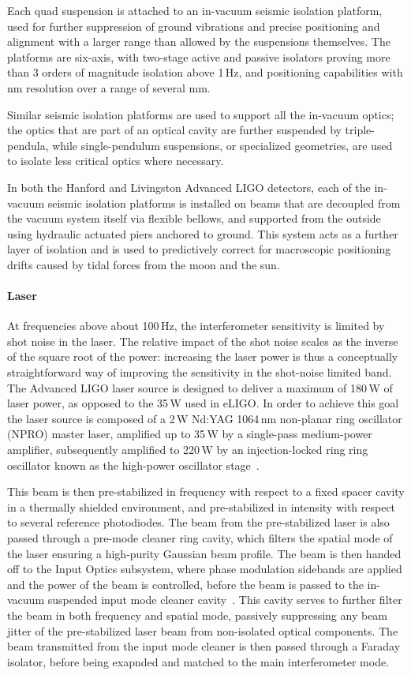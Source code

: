 Each quad suspension is attached to an in-vacuum seismic isolation platform, 
used for further suppression of ground vibrations and precise positioning and 
alignment with a larger range than allowed by the suspensions themselves. The 
platforms are six-axis, with two-stage active and passive isolators proving more 
than 3 orders of magnitude isolation above 1\,Hz, and positioning capabilities 
with nm resolution over a range of several mm.

Similar seismic isolation platforms are used to support all the in-vacuum optics; 
the optics that are part of an optical cavity are further suspended by triple-pendula, while 
single-pendulum suspensions, or specialized geometries, are used to isolate 
less critical optics where necessary.

In both the Hanford and Livingston Advanced LIGO detectors, 
each of the in-vacuum seismic isolation platforms is 
installed on beams that are decoupled from the vacuum system itself via 
flexible bellows, and supported from the outside using hydraulic actuated 
piers anchored to ground.
This system acts as a further layer of isolation and is used to predictively correct for macroscopic positioning drifts caused by tidal forces from the moon and the sun.

\paragraph*{Laser}
At frequencies above about 100\,Hz, the interferometer sensitivity is limited by shot 
noise in the laser. The relative impact of the shot noise scales as the inverse of the 
square root of the power: increasing the laser power is thus a conceptually 
straightforward way of improving the sensitivity in the shot-noise limited band. 
The Advanced LIGO laser source is designed to deliver a maximum of 180\,W of laser power, as opposed to the 35\,W used in eLIGO.
In order to achieve this goal the laser source is composed of a 2\,W Nd:YAG 1064\,nm non-planar ring oscillator (NPRO) master laser, amplified up to 35\,W by a single-pass medium-power amplifier, subsequently amplified to 220\,W by an injection-locked ring ring oscillator known as the high-power oscillator stage~\cite{Kwee_2012}. 

This beam is then pre-stabilized in frequency with respect to a fixed spacer cavity in a thermally shielded environment, and pre-stabilized in intensity with respect to several reference photodiodes. 
The beam from the pre-stabilized laser is also passed through a pre-mode cleaner ring cavity, which filters the spatial mode of the laser ensuring a high-purity Gaussian beam profile. 
The beam is then handed off to the Input Optics subsystem, where phase modulation sidebands are applied and the power of the beam is controlled, before the beam is passed to the in-vacuum suspended input mode cleaner cavity~\cite{Mueller_2016}. 
This cavity serves to further filter the beam in both frequency and spatial mode, passively suppressing any beam jitter of the pre-stabilized laser beam from non-isolated optical components. 
The beam transmitted from the input mode cleaner is then passed through a Faraday isolator, before being exapnded and matched to the 
main interferometer mode.

